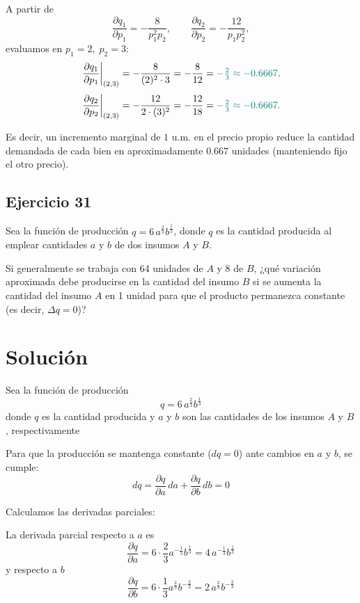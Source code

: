 \documentclass{article}
\begin{document}
A partir de
\[
\frac{\partial q_1}{\partial p_1}
=-\frac{8}{p_1^2p_2},
\qquad
\frac{\partial q_2}{\partial p_2}
=-\frac{12}{p_1p_2^2},
\]
evaluamos en \(p_1=2,\;p_2=3\):
\[
\left.\frac{\partial q_1}{\partial p_1}\right|_{(2,3)}
= -\frac{8}{(2)^2\cdot 3}
= -\frac{8}{12}
= \color{teal}{-\tfrac{2}{3}}\approx -0.6667,
\]
\[
\left.\frac{\partial q_2}{\partial p_2}\right|_{(2,3)}
= -\frac{12}{2\cdot (3)^2}
= -\frac{12}{18}
=\color{teal} {-\tfrac{2}{3}}\approx -0.6667.
\]

Es decir, un incremento marginal de \(1\) u.m. en el precio propio reduce la cantidad demandada
de cada bien en aproximadamente \(0.667\) unidades (manteniendo fijo el otro precio).


\newpage

\subsection{Ejercicio 31}

Sea la función de producción \( q = 6\, a^{\frac{2}{3}} b^{\frac{1}{3}} \), donde \( q \) es la cantidad producida al emplear cantidades \( a \) y \( b \) de dos insumos \( A \) y \( B \). 

Si generalmente se trabaja con 64 unidades de \( A \) y 8 de \( B \), ¿qué variación aproximada debe producirse en la cantidad del insumo \( B \) si se aumenta la cantidad del insumo \( A \) en 1 unidad para que el producto permanezca constante (es decir, \( \Delta q = 0 \))?

\newpage
\section*{Solución}

Sea la función de producción
\[
q = 6\, a^{\frac{2}{3}}b^{\frac{1}{3}}
\]
donde \(q\) es la cantidad producida y \(a\) y \(b\) son las cantidades de los insumos \(A\) y \(B\), respectivamente

Para que la producción se mantenga constante (\(dq = 0\)) ante cambios en \(a\) y \(b\), se cumple:
\[
dq = \frac{\partial q}{\partial a}\, da + \frac{\partial q}{\partial b}\, db = 0
\]

Calculamos las derivadas parciales:

La derivada parcial respecto a \(a\) es
\[
\frac{\partial q}{\partial a} = 6 \cdot \frac{2}{3}a^{-\frac{1}{3}}b^{\frac{1}{3}} = 4\, a^{-\frac{1}{3}}b^{\frac{1}{3}}
\]
y respecto a \(b\)
\[
\frac{\partial q}{\partial b} = 6 \cdot \frac{1}{3}a^{\frac{2}{3}}b^{-\frac{2}{3}} = 2\, a^{\frac{2}{3}}b^{-\frac{2}{3}}
\]
\end{document}
